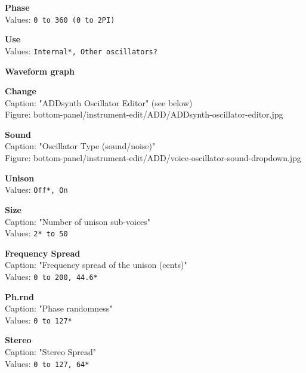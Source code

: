 \documentclass[
 11pt,
 twoside,
 a4paper,
 headinclude,
 footinclude,
 final                                 %
]{article}
\begin{document}
\begin{enumber}
\begin{enumber}
\begin{enumber}
\begin{enumber}
\begin{enumber}
\begin{enumber}
                     \item \textbf{Phase} \\
                        Values: \texttt{0 to 360 (0 to 2PI)}
                     \item \textbf{Use} \\
                        Values: \texttt{Internal*, Other oscillators?}
                     \item \textbf{Waveform graph}
                     \item \textbf{Change} \\
                        Caption: "ADDsynth Oscillator Editor" (see below)\\
                        Figure: bottom-panel/instrument-edit/ADD/ADDsynth-oscillator-editor.jpg
                     \item \textbf{Sound} \\
                        Caption: "Oscillator Type (sound/noise)" \\
                        Figure: bottom-panel/instrument-edit/ADD/voice-oscillator-sound-dropdown.jpg
                     \item \textbf{Unison} \\
                        Values: \texttt{Off*, On}
                        \begin{enumber}
                           \item \textbf{Size} \\
                              Caption: "Number of unison sub-voices" \\
                              Values: \texttt{2* to 50}
                           \item \textbf{Frequency Spread} \\
                              Caption: "Frequency spread of the unison (cents)" \\
                              Values: \texttt{0 to 200, 44.6*}
                           \item \textbf{Ph.rnd} \\
                              Caption: "Phase randomness" \\
                              Values: \texttt{0 to 127*}
                           \item \textbf{Stereo} \\
                              Caption: "Stereo Spread" \\
                              Values: \texttt{0 to 127, 64*}

\end{enumber}
\end{enumber}
\end{enumber}
\end{enumber}
\end{enumber}
\end{enumber}
\end{enumber}
\end{document}
